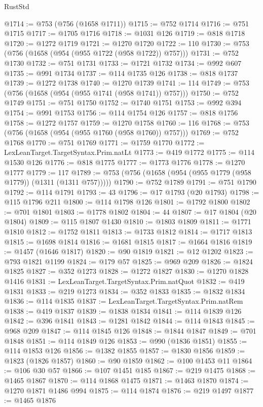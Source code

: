 \begin{lexlean}{RustStd}
\begin{coremodule}
{\begin{coremodule}
{{{{{{{{{{{{{{{{{{{{{{{{{{{{{{{{{{{{{{{{{{{{{{{{{{@1714 := @753 (@756 (@1658 @1711))
@1715 := @752 @1714
@1716 := @751 @1715
@1717 := @1705 @1716
@1718 := @1031 @126
@1719 := @818 @1718
@1720 := @1272 @1719
@1721 := @1270 @1720
@1722 := 110
@1730 := @753 (@756 (@1658 (@954 (@955 @1722 (@958 @1722)) @757)))
@1731 := @752 @1730
@1732 := @751 @1731
@1733 := @1721 @1732
@1734 := @992 @607
@1735 := @991 @1734
@1737 := @114 @1735 @126
@1738 := @818 @1737
@1739 := @1272 @1738
@1740 := @1270 @1739
@1741 := 114
@1749 := @753 (@756 (@1658 (@954 (@955 @1741 (@958 @1741)) @757)))
@1750 := @752 @1749
@1751 := @751 @1750
@1752 := @1740 @1751
@1753 := @992 @394
@1754 := @991 @1753
@1756 := @114 @1754 @126
@1757 := @818 @1756
@1758 := @1272 @1757
@1759 := @1270 @1758
@1760 := 116
@1768 := @753 (@756 (@1658 (@954 (@955 @1760 (@958 @1760)) @757)))
@1769 := @752 @1768
@1770 := @751 @1769
@1771 := @1759 @1770
@1772 := LexLeanTarget.TargetSyntax.Prim.natLt
@1773 := @419 @1772
@1775 := @114 @1530 @126
@1776 := @818 @1775
@1777 := @1773 @1776
@1778 := @1270 @1777
@1779 := 117
@1789 := @753 (@756 (@1658 (@954 (@955 @1779 (@958 @1779)) (@1311 (@1311 @757)))))
@1790 := @752 @1789
@1791 := @751 @1790
@1792 := @114 @1791
@1793 := 43
@1796 := @17 @1793 (@20 @1793)
@1798 := @115 @1796 @211
@1800 := @114 @1798 @126
@1801 := @1792 @1800
@1802 := @701 @1801
@1803 := @1778 @1802
@1804 := 44
@1807 := @17 @1804 (@20 @1804)
@1809 := @115 @1807 @1430
@1810 := @1803 @1809
@1811 := @1771 @1810
@1812 := @1752 @1811
@1813 := @1733 @1812
@1814 := @1717 @1813
@1815 := @1698 @1814
@1816 := @1681 @1815
@1817 := @1664 @1816
@1819 := @1457 (@1646 @1817)
@1820 := @90 @1819
@1821 := @12 @1202
@1823 := @793 @1821 @1199
@1824 := @179 @57
@1825 := @969 @209
@1826 := @1824 @1825
@1827 := @352 @1273
@1828 := @1272 @1827
@1830 := @1270 @1828 @1416
@1831 := LexLeanTarget.TargetSyntax.Prim.natQuot
@1832 := @419 @1831
@1833 := @219 @1273
@1834 := @352 @1833
@1835 := @1832 @1834
@1836 := @114 @1835
@1837 := LexLeanTarget.TargetSyntax.Prim.natRem
@1838 := @419 @1837
@1839 := @1838 @1834
@1841 := @114 @1839 @126
@1842 := @396 @1841
@1843 := @1281 @1842
@1844 := @114 @1843
@1845 := @968 @209
@1847 := @114 @1845 @126
@1848 := @1844 @1847
@1849 := @701 @1848
@1851 := @114 @1849 @126
@1853 := @990 (@1836 @1851)
@1855 := @114 @1853 @126
@1856 := @1382 @1855
@1857 := @1830 @1856
@1859 := @1823 (@1826 @1857)
@1860 := @90 @1859
@1862 := @100 @1453 @11
@1864 := @106 @30 @57
@1866 := @107 @1451 @185
@1867 := @219 @1475
@1868 := @1465 @1867
@1870 := @114 @1868 @1475
@1871 := @1463 @1870
@1874 := @1270 @1871 @1486 @994
@1875 := @114 @1874
@1876 := @219 @1497
@1877 := @1465 @1876
}}}}}}}}}}}}}}}}}}}}}}}}}}}}}}}}}}}}}}}}}}}}}}}}}}
\end{coremodule}}
\end{coremodule}
\end{lexlean}
